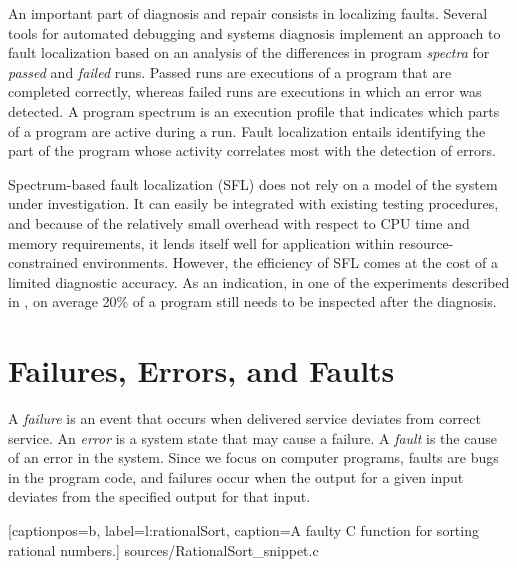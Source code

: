 

An important part of diagnosis and repair consists in
localizing faults.
Several tools for automated 
debugging and systems diagnosis implement an approach
to fault localization based on an analysis of the 
differences in program \emph{spectra} for \emph{passed} and \emph{failed}
runs. Passed runs are executions of a program that
are completed correctly, whereas failed runs are executions
in which an error was detected. A program spectrum is
an execution profile that indicates which parts of a 
program are active during a run. Fault localization entails
identifying the part of the program whose activity 
correlates most with the detection of errors. 

Spectrum-based fault localization (SFL) does not rely on
a model of the system under investigation. It can easily 
be integrated with existing testing procedures, and
because of the relatively small overhead with respect
to CPU time and memory requirements, it lends itself
well for application within resource-constrained 
environments. However, the efficiency of 
SFL comes at the cost of a limited
diagnostic accuracy. 
As an indication, in one of the 
experiments described in 
\cite{sfltaicpart}, 
on average
20\% of a program still needs to be inspected after the
diagnosis.

\section{Failures, Errors, and Faults}
\label{s:failuresErrorsFaults}
A \emph{failure} is an event that occurs when delivered service
deviates from correct service. An \emph{error} is a system
state that may cause a failure. A \emph{fault} is the cause of
an error in the system.
Since we focus on computer programs, faults are bugs in the program code, and failures occur
when the output for a given input deviates from the
specified output for that input.

\newpage


	[captionpos=b, label=l:rationalSort, caption=A faulty C function for sorting rational numbers.]
	{sources/RationalSort_snippet.c}
	
